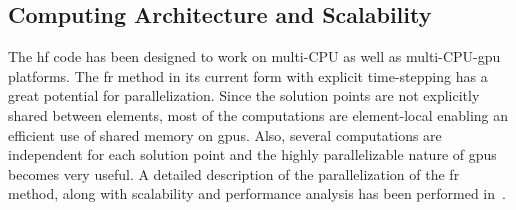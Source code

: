 \subsection{Computing Architecture and Scalability}

The \gls{hf} code has been designed to work on multi-CPU as well as multi-CPU-\gls{gpu} platforms. The \gls{fr} method in its current form with explicit time-stepping has a great potential for parallelization. Since the solution points are not explicitly shared between elements, most of the computations are element-local enabling an efficient use of shared memory on \gls{gpu}s. Also, several computations are independent for each solution point and the highly parallelizable nature of \gls{gpu}s becomes very useful. A detailed description of the parallelization of the \gls{fr} method, along with scalability and performance analysis has been performed in~\cite{castonguay2011}.